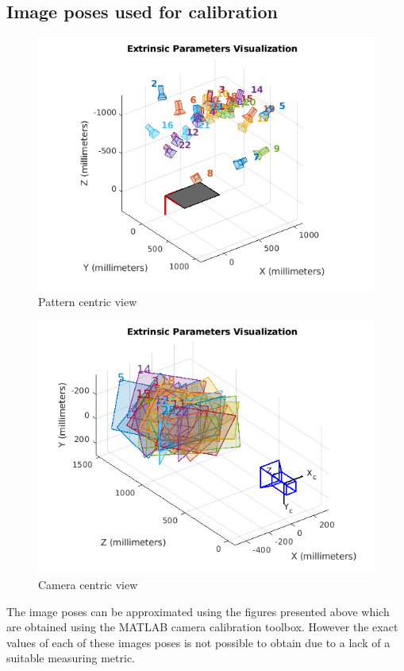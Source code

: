 \documentclass[11pt,a4paper]{article}
\begin{document}
				\subsection{Image poses used for calibration}
				
				\begin{figure}[H]
					\includegraphics[scale=0.7]{pattern_centric_view.png}
					\caption{Pattern centric view}
				\end{figure}
				
				\begin{figure}[H]
					\includegraphics[scale=0.7]{camera_centric_view.png}
					\caption{Camera centric view}
				\end{figure}
				The image poses can be approximated using the figures presented above which are obtained using the MATLAB camera calibration toolbox. However the exact values of each of these images poses is not possible to obtain due to a lack of a suitable measuring metric.
\end{document}
